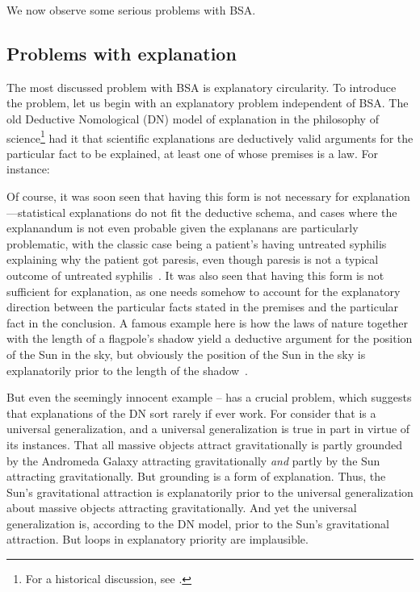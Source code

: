 We now observe some serious problems with BSA.

\subsection{Problems with explanation}\label{sec:law-explanation}
The most discussed problem with BSA is explanatory circularity. To introduce the problem, let us begin with an explanatory 
problem independent of BSA. The old Deductive Nomological (DN) model of explanation in the philosophy of science\footnote{For a historical discussion, see .} had it
that scientific explanations are deductively valid arguments for the particular fact to be explained, at least one of whose premises 
is a law. For instance:

Of course, it was soon seen that having this form is not necessary for explanation---statistical explanations do not fit the
deductive schema, and cases where the explanandum is not even probable given the explanans are particularly 
problematic, with the classic case being a patient's having untreated syphilis explaining why the patient got paresis,
even though paresis is not a typical outcome of untreated syphilis~\parencite[p.~49]{SalmonFourDecades}. It was also seen that having this form is not sufficient for explanation, as one needs somehow to account
for the explanatory direction between the particular facts stated in the premises and the particular fact in the conclusion.
A famous example here is how the laws of nature together with the length of a flagpole's shadow yield a deductive argument
for the position of the Sun in the sky, but obviously the position of the Sun in the sky is explanatorily prior to the length of
the shadow~\parencite[p.~47]{SalmonFourDecades}.

But even the seemingly innocent example -- has a crucial problem, which suggests that
explanations of the DN sort rarely if ever work. For consider that  is a universal generalization, and a universal
generalization is true in part in virtue of its instances. That all massive objects attract gravitationally is partly grounded
by the Andromeda Galaxy attracting gravitationally \textit{and} partly by the Sun attracting gravitationally. But grounding is a 
form of explanation. Thus, the Sun's gravitational attraction is explanatorily prior to the universal generalization about massive
objects attracting gravitationally. And yet the universal generalization is, according to the DN model, prior to the Sun's gravitational
attraction. But loops in explanatory priority are implausible.


